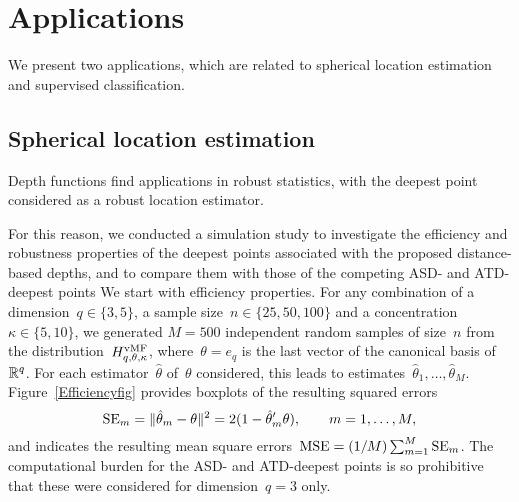 \documentclass[usenames,dvipsnames]{article}
\begin{document}

\section{Applications}
\label{secSimu}

We present two applications, which are related to spherical location estimation and supervised classification. 


\subsection{Spherical location estimation}
\label{secSimusub1}

Depth functions find applications in robust statistics, with the deepest point considered as a robust location estimator.

For this reason, we conducted a simulation study to investigate the efficiency and robustness properties of the deepest points associated with the proposed distance-based depths, and to compare them with those of the competing ASD- and ATD-deepest points
We start with efficiency properties. For any combination of a dimension~$q\in\{3,5\}$, a sample size~$n\in\{25,50,100\}$ and a concentration~$\kappa\in\{5,10\}$, we generated $M=500$ independent random samples of size~$n$ from the distribution~$H^{\rm vMF}_{q,\theta,\kappa}$, where~$\theta=e_q$ is the last vector of the canonical basis of~$\mathbb{R}^q$. 
For each estimator~$\hat{\theta}$ of~$\theta$ considered, this leads to estimates~$\hat{\theta}_{1},\ldots,\hat{\theta}_{M}$. %
Figure~\ref{Efficiencyfig} provides boxplots of the resulting squared errors 
\begin{equation}
{\rm SE}_{m} 
= 
 \|\hat{\theta}_{m}- \theta\|^2
= 
2 (1 - \hat{\theta}_{m}' \theta)
,
\qquad
m=1,\ldots, M,
\label{SEdef}	
\end{equation}
and indicates the resulting mean square errors~${\rm MSE} = (1/M) \sum_{m=1}^M {\rm SE}_{m}$. The computational burden for the ASD- and ATD-deepest points is so prohibitive that these were considered for dimension~$q=3$ only.
\end{document}
